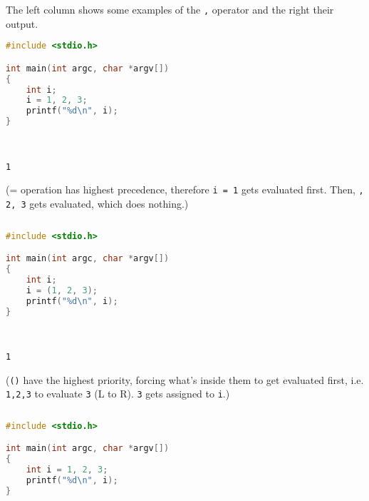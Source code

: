\begin{exmp}
The left column shows some examples of the \texttt{,} operator and the right their output. 
\begin{multicols}{2}

\begin{lstlisting}[language=c]
#include <stdio.h>

int main(int argc, char *argv[])
{
	int i;
	i = 1, 2, 3;	
	printf("%d\n", i);
}
\end{lstlisting}

\columnbreak 
\; \\
\begin{verbatim}
1
\end{verbatim}

(= operation has highest precedence, therefore \texttt{i = 1} gets evaluated first. Then, \texttt{, 2, 3} gets evaluated, which does nothing.)
\begin{verbatim}
\end{verbatim}
\end{multicols}

\begin{multicols}{2}

\begin{lstlisting}[language=c]
#include <stdio.h>

int main(int argc, char *argv[])
{
	int i;
	i = (1, 2, 3);	
	printf("%d\n", i);
}
\end{lstlisting}

\columnbreak
\; \\
\begin{verbatim}
1
\end{verbatim}

(\texttt{()} have the highest priority, forcing what's inside them to get evaluated first, i.e. \texttt{1,2,3} to evaluate \texttt{3} (L to R). \texttt{3} gets assigned to \texttt{i}.)
\begin{verbatim}
\end{verbatim}
\end{multicols}

\begin{multicols}{2}

\begin{lstlisting}[language=c]
#include <stdio.h>

int main(int argc, char *argv[])
{
	int i = 1, 2, 3;	
	printf("%d\n", i);
}
\end{lstlisting}


\end{multicols}
\end{exmp}

